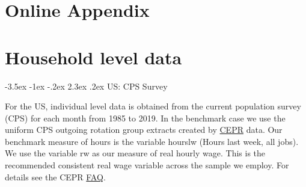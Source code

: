 \documentclass[a4paper,12pt]{article}%
\makeatletter
\renewcommand\subsection{\@startsection {subsection}{2}{\z@}%
                  {-3.5ex \@plus -1ex \@minus -.2ex}%
                  {2.3ex \@plus.2ex}%
                  {\centering\normalsize\scshape\color{black}}}
\makeatother
\begin{document}
 \clearpage
 \newpage

%


\newpage
\clearpage





\clearpage
\newpage
\appendix
\renewcommand\thefigure{\thesection.\arabic{figure}}    
\renewcommand\thetable{\thesection.\arabic{table}}    
\renewcommand\theequation{\thesection.\arabic{equation}}    
\renewcommand\thetheorem{\thesection.\arabic{theorem}}   


\section*{Online Appendix}

\bigskip


\section{Household level data}\label{App:Data}


\subsection{US: CPS Survey}\label{App:Data:US:CPS}


For the US, individual level data is obtained from the current
population survey (CPS) for each month from 1985 to 2019. In the benchmark case we use the uniform CPS outgoing rotation group extracts created by \href{https://ceprdata.org/}{CEPR} data. Our benchmark measure of hours is the variable hourslw (Hours last week, all jobs). We use the variable rw as our measure of real hourly wage. This is the recommended consistent real wage variable across the sample we employ. For details see the CEPR \href{https://ceprdata.org/cps-uniform-data-extracts/cps-outgoing-rotation-group/cps-org-faq}{FAQ}.
\end{document}
